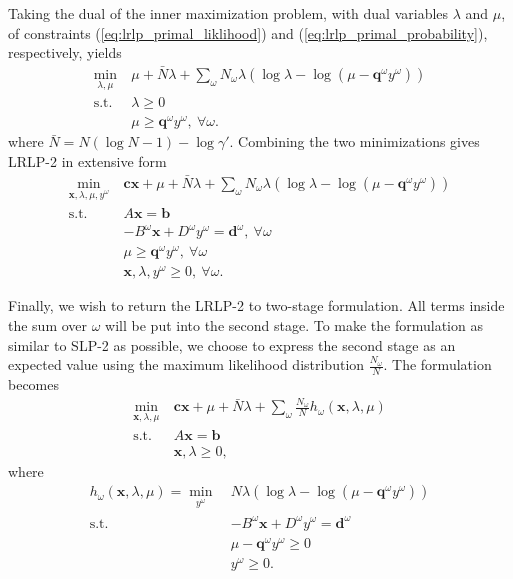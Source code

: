 \documentclass[11pt]{article}
\newcommand{\x}{\mathbf{x}}
\renewcommand{\c}{\mathbf{c}}
\newcommand{\q}{\mathbf{q}}
\renewcommand{\b}{\mathbf{b}}
\renewcommand{\d}{\mathbf{d}}
\newcommand{\st}{\mbox{s.t.}}
\begin{document}
Taking the dual of the inner maximization problem, with dual variables $\lambda$ and $\mu$, of constraints (\ref{eq:lrlp_primal_liklihood}) and (\ref{eq:lrlp_primal_probability}), respectively, yields
\begin{align*}
	\min_{\lambda,\mu} \ & \mu + \bar{N}\lambda + \sum_\omega N_\omega\lambda(\log\lambda - \log(\mu-\q^\omega y^\omega)) \\
	\st \ & \lambda \geq 0 \\
	& \mu \geq \q^\omega y^\omega, \ \forall \omega.
\end{align*}
where $\bar{N} = N(\log N - 1) - \log\gamma'$.
Combining the two minimizations gives LRLP-2 in extensive form
\begin{align}
	\min_{\x,\lambda,\mu,y^\omega} \ & \c\x + \mu + \bar{N}\lambda + \sum_\omega N_\omega\lambda(\log\lambda - \log(\mu-\q^\omega y^\omega)) \nonumber \\
	\st \ & A\x = \b \nonumber \\
	& -B^\omega \x + D^\omega y^\omega = \d^\omega,\ \forall \omega \label{eq:lrlp_det_equiv} \\
	& \mu \geq \q^\omega y^\omega, \ \forall \omega \nonumber \\
	& \x,\lambda,y^\omega \geq 0, \ \forall \omega. \nonumber
\end{align}

Finally, we wish to return the LRLP-2 to two-stage formulation.
All terms inside the sum over $\omega$ will be put into the second stage.
To make the formulation as similar to SLP-2 as possible, we choose to express the second stage as an expected value using the maximum likelihood distribution $\frac{N_\omega}{N}$.
The formulation becomes
\begin{align}
	\min_{\x,\lambda,\mu} \ & \c\x + \mu + \bar{N}\lambda + \sum_\omega \frac{N_\omega}{N} h_\omega(\x,\lambda,\mu) \nonumber \\
	\st \ & A\x = \b \label{eq:lrlp_two_stage} \\
	& \x,\lambda \geq 0, \nonumber
\end{align}
where
\begin{align}
	h_\omega(\x,\lambda,\mu) = \min_{y^\omega} \ & N\lambda (\log\lambda - \log(\mu - \q^\omega y^\omega)) \label{eq:lrlp_second_stage} \\
	\st \ & -B^\omega \x + D^\omega y^\omega = \d^\omega \nonumber \\
	& \mu - \q^\omega y^\omega \geq 0 \label{eq:lrlp_feas_constraint} \\
	& y^\omega \geq 0. \nonumber
\end{align}
\end{document}
